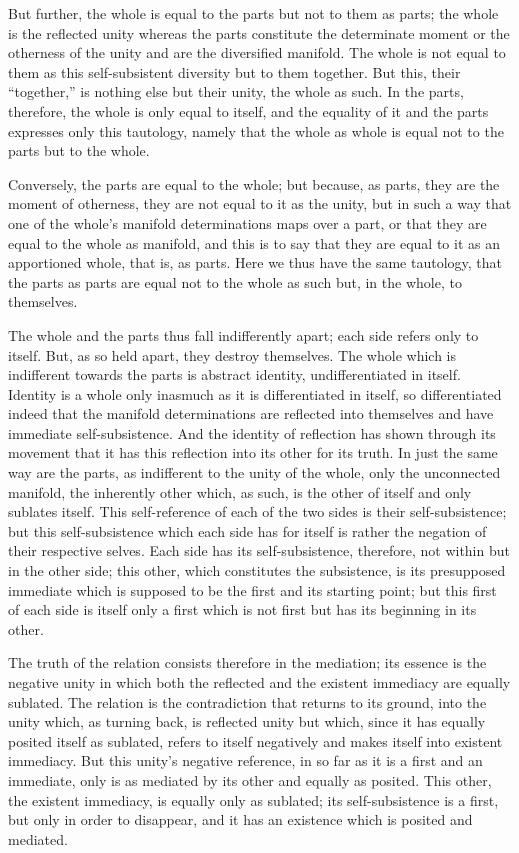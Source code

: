 But further, the whole is equal to the parts
but not to them as parts;
the whole is the reflected unity
whereas the parts constitute
the determinate moment
or the otherness of the unity
and are the diversified manifold.
The whole is not equal to them
as this self-subsistent diversity
but to them together.
But this, their “together,” is
nothing else but their unity,
the whole as such.
In the parts, therefore, the whole
is only equal to itself,
and the equality of it and the parts expresses
only this tautology,
namely that the whole as whole is equal
not to the parts but to the whole.

Conversely, the parts are equal to the whole;
but because, as parts,
they are the moment of otherness,
they are not equal to it as the unity,
but in such a way that one of the whole's
manifold determinations maps over a part,
or that they are equal to the whole as manifold,
and this is to say that they are equal to it
as an apportioned whole, that is, as parts.
Here we thus have the same tautology,
that the parts as parts are equal
not to the whole as such
but, in the whole, to themselves.

The whole and the parts thus
fall indifferently apart;
each side refers only to itself.
But, as so held apart, they destroy themselves.
The whole which is indifferent towards the parts is
abstract identity, undifferentiated in itself.
Identity is a whole only inasmuch
as it is differentiated in itself,
so differentiated indeed that the manifold
determinations are reflected into themselves
and have immediate self-subsistence.
And the identity of reflection has
shown through its movement
that it has this reflection
into its other for its truth.
In just the same way are the parts,
as indifferent to the unity of the whole,
only the unconnected manifold,
the inherently other which, as such,
is the other of itself and only sublates itself.
This self-reference of each of the two sides
is their self-subsistence;
but this self-subsistence which
each side has for itself is rather
the negation of their respective selves.
Each side has its self-subsistence, therefore,
not within but in the other side;
this other, which constitutes the subsistence,
is its presupposed immediate which is supposed
to be the first and its starting point;
but this first of each side is itself
only a first which is not first
but has its beginning in its other.

The truth of the relation consists
therefore in the mediation;
its essence is the negative unity
in which both the reflected
and the existent immediacy
are equally sublated.
The relation is the contradiction
that returns to its ground,
into the unity which,
as turning back,
is reflected unity
but which, since it has
equally posited itself as sublated,
refers to itself negatively
and makes itself into existent immediacy.
But this unity's negative reference,
in so far as it is a first and an immediate,
only is as mediated by its other
and equally as posited.
This other, the existent immediacy,
is equally only as sublated;
its self-subsistence is a first,
but only in order to disappear,
and it has an existence
which is posited and mediated.

